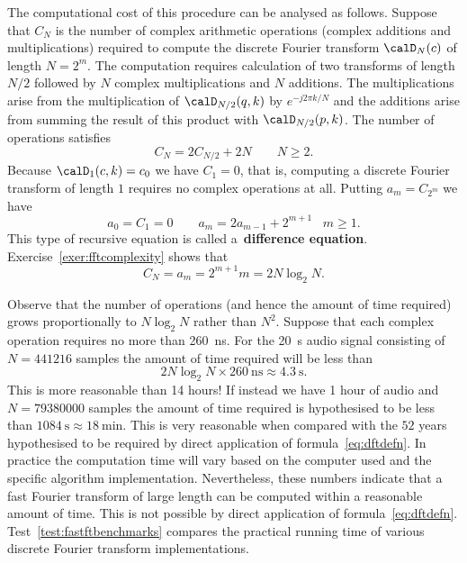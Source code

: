 \documentclass[11pt,a4paper]{book}
\theoremstyle{plain}
\numberwithin{equation}{section}
\newcommand{\term}{\textbf}
\newcounter{test}
\begin{document}
The computational cost of this procedure can be analysed as follows.  Suppose that $C_N$ is the number of complex arithmetic operations (complex additions and multiplications) required to compute the discrete Fourier transform $\calD_N(c)$ of length $N = 2^m$.  The computation requires calculation of two transforms of length $N/2$ followed by $N$ complex multiplications and $N$ additions.  The multiplications arise from the multiplication of $\calD_{N/2}(q, k)$ by $e^{-j 2\pi k / N}$ and the additions arise from summing the result of this product with $\calD_{N/2}(p, k)$.  The number of operations satisfies
\[
C_N = 2C_{N/2} + 2N \qquad N \geq 2.
\]
Because $\calD_1(c,k) = c_0$ we have $C_1 = 0$, that is, computing a discrete Fourier transform of length $1$ requires no complex operations at all.  Putting $a_m = C_{2^m}$ we have
\begin{equation}\label{eq:recursiveeqcomplexityfft}
a_0 = C_1 = 0 \qquad a_m = 2 a_{m-1} + 2^{m+1} \;\;\; m \geq 1.
\end{equation}
This type of recursive equation is called a~\term{difference equation}.  %
Exercise~\ref{exer:fftcomplexity} shows that
\[
C_{N} = a_{m} = 2^{m+1}m = 2N\log_2 N.
\]

Observe that the number of operations (and hence the amount of time required) grows proportionally to $N\log_2 N$ rather than $N^2$.  Suppose that each complex operation requires no more than \SI{260}{\nano\second}.  For the \SI{20}{\second} audio signal consisting of $N = 441216$ samples the amount of time required will be less than
\begin{equation}\label{eq:runtimefftcooleytukeyapprox}
2N \log_2 N \times \SI{260}{\nano\second} \approx \SI{4.3}{\second}.
\end{equation} 
This is more reasonable than 14 hours!  If instead we have 1 hour of audio and $N = 79380000$ samples the amount of time required is hypothesised to be less than $\SI{1084}{\second} \approx \SI{18}{\minute}$.  This is very reasonable when compared with the $52$ years hypothesised to be required by direct application of formula~\eqref{eq:dftdefn}.  In practice the computation time will vary based on the computer used and the specific algorithm implementation.  Nevertheless, these numbers indicate that a fast Fourier transform of large length can be computed within a reasonable amount of time.  This is not possible by direct application of formula~\eqref{eq:dftdefn}.  Test~\ref{test:fastftbenchmarks} compares the practical running time of various discrete Fourier transform implementations.
\end{document}
